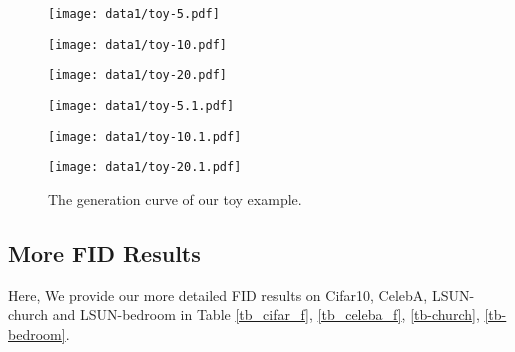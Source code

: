 \documentclass{article}
\begin{document}
\begin{figure}[!htbp]
   \centering
   \begin{minipage}[t]{0.329\linewidth}
      \centering
      \texttt{[image: data1/toy-5.pdf]}   
   \end{minipage}
   \begin{minipage}[t]{0.329\linewidth}
      \centering
      \texttt{[image: data1/toy-10.pdf]}   
   \end{minipage}
   \begin{minipage}[t]{0.329\linewidth}
      \centering
      \texttt{[image: data1/toy-20.pdf]}   
   \end{minipage}
   \begin{minipage}[t]{0.329\linewidth}
      \centering
      \texttt{[image: data1/toy-5.1.pdf]}   
   \end{minipage}
   \begin{minipage}[t]{0.329\linewidth}
      \centering
      \texttt{[image: data1/toy-10.1.pdf]}   
   \end{minipage}
   \begin{minipage}[t]{0.329\linewidth}
      \centering
      \texttt{[image: data1/toy-20.1.pdf]}   
   \end{minipage}
   \caption{The generation curve of our toy example.}
   \label{fi_toy}
\end{figure}


\subsection{More FID Results}
\label{more_fid}

Here, We provide our more detailed FID results on Cifar10, CelebA, LSUN-church and LSUN-bedroom in Table \ref{tb_cifar_f}, \ref{tb_celeba_f}, \ref{tb-church}, \ref{tb-bedroom}.
\end{document}
